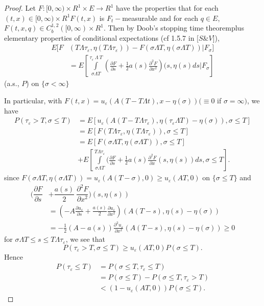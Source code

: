 \begin{proof}
Let $F:[0, \infty) \times R^1 \times E \to R^1$ have the properties
  that for each $(t, x)\in [0, \infty) \times R^1 F(t, x)$ is
    $F_t-$measurable and for each $q \in E$, $F(t, x,
    q)\in C_b^{1,2}([0, \infty)\times R^1$. Then by Doob's
      stopping time theorem\pageoriginale plus elementary properties
      of conditional expectations (cf 1.5.7 in [$S \& V $]),  
\begin{align*}
E[F & (T \Lambda \tau_{\varepsilon}, \eta(T \Lambda
  \tau_{\varepsilon}))-F(\sigma \Lambda T, \eta (\sigma \Lambda
  T))|F_{\sigma}] \\
& =E[\int\limits_{\sigma \Lambda T}^{\tau_{\varepsilon}~\Lambda
    ~T}(\frac{\partial F}{\partial s}+\frac{1}{2}a(s) \frac{\partial^2
    F}{\partial x^2})(s, \eta(s)ds|F_{\sigma}] 
\end{align*}
(a.s., $P$) on $\{\sigma < \infty\}$

In particular, with $F(t, x)=u_{\varepsilon}(A(T-T \Lambda t), x-
\eta(\sigma))(\equiv 0$ if $\sigma=\infty)$, we have 
\begin{align*}
P(\tau_{\varepsilon}> T, \sigma \leq T) &=E[u_{\varepsilon}(A(T-T
\Lambda \tau_{\varepsilon}), \eta(\tau_{\varepsilon} \Lambda
  T)-\eta(\sigma)), \sigma \leq T]\\ 
&=E[F(T \Lambda \tau_{\varepsilon}, \eta(T \Lambda
  \tau_{\varepsilon})), \sigma \leq T]\\ 
&=E[F(\sigma \Lambda T, \eta(\sigma \Lambda T)), \sigma \leq T]\\ 
&+ E[\int\limits_{\sigma \Lambda T}^{T \Lambda \tau_{\varepsilon}}
  ( \frac{\partial F}{\partial s}+ \frac{1}{2}a(s)\frac{\partial ^2
    F}{\partial x}(s, \eta(s))ds, \sigma \leq T]. 
\end{align*}
since $F(\sigma \Lambda T, \eta(\sigma \Lambda T))=
u_{\varepsilon}(A(T-\sigma),0) \geq u_{\varepsilon}(AT, 0)$ on
$\{\sigma \leq T\}$ and 
\begin{align*}
(\dfrac{\partial F}{\partial s} & + \dfrac{a(s)}{2}~\dfrac{\partial^2
  F}{\partial x^2})(s, \eta(s))\\
&=(-A\frac{\partial u_{\varepsilon}}{\partial s}+\frac{a(s)}{2}
  \frac{\partial u_{\varepsilon}}{\partial x^2}) (A(T-s),
  \eta(s)-\eta(\sigma))\\ 
&=-\frac{1}{2}(A-a(s))\frac{\partial^2 u_{\varepsilon}}{\partial
    x^2}(A(T-s), \eta(s)-\eta(\sigma))\geq 0 
\end{align*}
for $\sigma \Lambda T \leq s \leq T \Lambda \tau_{\varepsilon}$, we see
that 
$$
P(\tau_{\varepsilon}> T, \sigma \leq T)\geq u_{\varepsilon}(AT, 0)P
(\sigma \leq T). 
$$
Hence
\begin{align*}
P(\tau_{\varepsilon} \leq T)& = P(\sigma \leq T, \tau_{\varepsilon}
\leq T)\\ 
&=P(\sigma \leq T)- P(\sigma \leq T,\tau_{\varepsilon}> T)\\
&<(1-u_{\varepsilon}(AT, 0))P(\sigma \leq T).
\end{align*}\pageoriginale
\end{proof}


